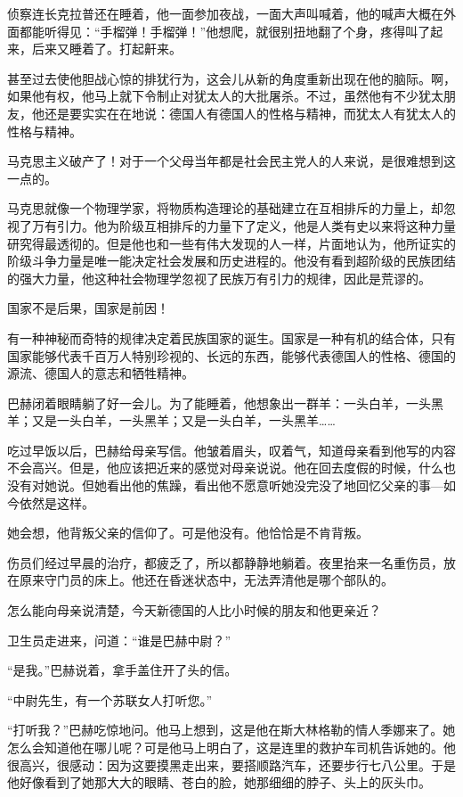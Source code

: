 侦察连长克拉普还在睡着，他一面参加夜战，一面大声叫喊着，他的喊声大概在外面都能听得见：“手榴弹！手榴弹！”他想爬，就很别扭地翻了个身，疼得叫了起来，后来又睡着了。打起鼾来。

甚至过去使他胆战心惊的排犹行为，这会儿从新的角度重新出现在他的脑际。啊，如果他有权，他马上就下令制止对犹太人的大批屠杀。不过，虽然他有不少犹太朋友，他还是要实实在在地说：德国人有德国人的性格与精神，而犹太人有犹太人的性格与精神。

马克思主义破产了！对于一个父母当年都是社会民主党人的人来说，是很难想到这一点的。

马克思就像一个物理学家，将物质构造理论的基础建立在互相排斥的力量上，却忽视了万有引力。他为阶级互相排斥的力量下了定义，他是人类有史以来将这种力量研究得最透彻的。但是他也和一些有伟大发现的人一样，片面地认为，他所证实的阶级斗争力量是唯一能决定社会发展和历史进程的。他没有看到超阶级的民族团结的强大力量，他这种社会物理学忽视了民族万有引力的规律，因此是荒谬的。

国家不是后果，国家是前因！

有一种神秘而奇特的规律决定着民族国家的诞生。国家是一种有机的结合体，只有国家能够代表千百万人特别珍视的、长远的东西，能够代表德国人的性格、德国的源流、德国人的意志和牺牲精神。

巴赫闭着眼睛躺了好一会儿。为了能睡着，他想象出一群羊：一头白羊，一头黑羊；又是一头白羊，一头黑羊；又是一头白羊，一头黑羊……

吃过早饭以后，巴赫给母亲写信。他皱着眉头，叹着气，知道母亲看到他写的内容不会高兴。但是，他应该把近来的感觉对母亲说说。他在回去度假的时候，什么也没有对她说。但她看出他的焦躁，看出他不愿意听她没完没了地回忆父亲的事—如今依然是这样。

她会想，他背叛父亲的信仰了。可是他没有。他恰恰是不肯背叛。

伤员们经过早晨的治疗，都疲乏了，所以都静静地躺着。夜里抬来一名重伤员，放在原来守门员的床上。他还在昏迷状态中，无法弄清他是哪个部队的。

怎么能向母亲说清楚，今天新德国的人比小时候的朋友和他更亲近？

卫生员走进来，问道：“谁是巴赫中尉？”

“是我。”巴赫说着，拿手盖住开了头的信。

“中尉先生，有一个苏联女人打听您。”

“打听我？”巴赫吃惊地问。他马上想到，这是他在斯大林格勒的情人季娜来了。她怎么会知道他在哪儿呢？可是他马上明白了，这是连里的救护车司机告诉她的。他很高兴，很感动：因为这要摸黑走出来，要搭顺路汽车，还要步行七八公里。于是他好像看到了她那大大的眼睛、苍白的脸，她那细细的脖子、头上的灰头巾。

